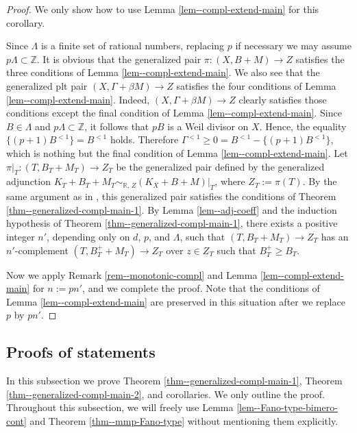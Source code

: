 \documentclass[12pt]{amsart}
\theoremstyle{definition}
\begin{document}
\begin{proof}
We only show how to use Lemma \ref{lem--compl-extend-main} for this corollary. 

Since $\Lambda$ is a finite set of rational numbers, replacing $p$ if necessary we may assume $p\Lambda \subset \mathbb{Z}$. 
It is obvious that the generalized pair $\pi \colon(X,B+M) \to Z$ satisfies the three conditions of Lemma \ref{lem--compl-extend-main}. 
We also see that the generalized plt pair $(X,\Gamma+\beta M) \to Z$ satisfies the four conditions of Lemma \ref{lem--compl-extend-main}. 
Indeed, $(X,\Gamma+\beta M) \to Z$ clearly satisfies those conditions except the final condition of Lemma \ref{lem--compl-extend-main}. 
Since $B \in \Lambda$ and $p\Lambda \subset \mathbb{Z}$, it follows that $pB$ is a Weil divisor on $X$. 
Hence, the equality $\{(p+1)B^{<1}\}=B^{<1}$ holds. 
Therefore $\Gamma^{<1} \geq 0 =B^{<1}-\{(p+1)B^{<1}\}$, which is nothing but the final condition of Lemma \ref{lem--compl-extend-main}. 
Let $\pi|_{T} \colon (T,B_{T}+M_{T}) \to Z_{T}$ be the generalized pair defined by the generalized adjunction $K_{T}+B_{T}+M_{T}\sim_{\mathbb{R},\,Z}(K_{X}+B+M)|_{T}$, where $Z_{T}:=\pi(T)$. 
By the same argument as in \cite[Step 1 in the proof of Proposition 8.1]{birkar-compl}, this generalized pair satisfies the conditions of Theorem \ref{thm--generalized-compl-main-1}. 
By Lemma \ref{lem--adj-coeff} and the induction hypothesis of Theorem \ref{thm--generalized-compl-main-1}, there exists a positive integer $n'$, depending only on $d$, $p$, and $\Lambda$, such that $(T,B_{T}+M_{T}) \to Z_{T}$ has an $n'$-complement $(T,B^{+}_{T}+M_{T}) \to Z_{T}$ over $z \in Z_{T}$ such that $B^{+}_{T} \geq B_{T}$. 

Now we apply Remark \ref{rem--monotonic-compl} and Lemma \ref{lem--compl-extend-main} for $n:=pn'$, and we complete the proof. 
Note that the conditions of Lemma \ref{lem--compl-extend-main} are preserved in this situation after we replace $p$ by $pn'$. 
\end{proof}


\subsection{Proofs of statements}\label{subsec--proof-comple}

In this subsection we prove Theorem \ref{thm--generalized-compl-main-1}, Theorem \ref{thm--generalized-compl-main-2}, and corollaries. 
We only outline the proof. 
Throughout this subsection, we will freely use Lemma \ref{lem--Fano-type-bimero-cont} and Theorem \ref{thm--mmp-Fano-type} without mentioning them explicitly. 
\end{document}
